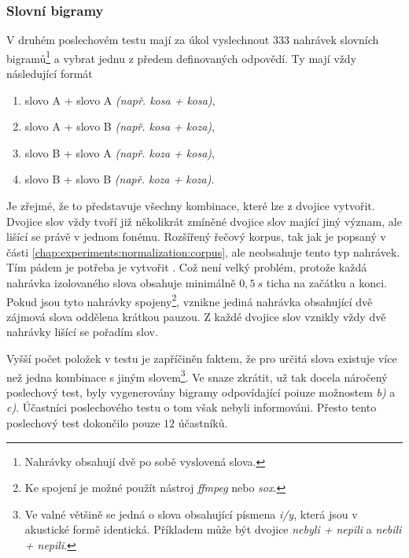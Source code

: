 \subsubsection{Slovní bigramy}

V druhém poslechovém testu mají za úkol vyslechnout $333$ nahrávek slovních bigramů\footnote{Nahrávky obsahují dvě po sobě vyslovená slova.} a vybrat jednu z předem definovaných odpovědí. Ty mají vždy následující formát

\begin{enumerate}[label=\alph*)]
  \item slovo A + slovo A \textit{(např. kosa + kosa)},
  \item slovo A + slovo B \textit{(např. kosa + koza)},
  \item slovo B + slovo A \textit{(např. koza + kosa)},
  \item slovo B + slovo B \textit{(např. koza + koza)}.
\end{enumerate}

\noindent Je zřejmé, že to představuje všechny kombinace, které lze z dvojice vytvořit. Dvojice slov vždy tvoří již několikrát zmíněné dvojice slov mající jiný význam, ale lišící se právě v jednom fonému. Rozšířený řečový korpus, tak jak je popsaný v části \ref{chap:experiments:normalization:corpus}, ale neobsahuje tento typ nahrávek. Tím pádem je potřeba je vytvořit . Což není velký problém, protože každá nahrávka izolovaného slova obsahuje minimálně $0,5\ s$ ticha na začátku a konci. Pokud jsou tyto nahrávky spojeny\footnote{Ke spojení je možné použít nástroj \textit{ffmpeg} nebo \textit{sox}.}, vznikne jediná nahrávka obsahující dvě zájmová slova oddělena krátkou pauzou. Z každé dvojice slov vznikly vždy dvě nahrávky lišící se pořadím slov.

Vyšší počet položek v testu je zapříčiněn faktem, že pro určitá slova existuje více než jedna kombinace s jiným slovem\footnote{Ve valné většině se jedná o slova obsahující písmena \textit{i/y}, která jsou v akustické formě identická. Příkladem může být dvojice \textit{nebyli + nepili} a \textit{nebili + nepili}.}. Ve snaze zkrátit, už tak docela náročený poslechový test, byly vygenerovány bigramy odpovídající poiuze možnostem \textit{b)} a \textit{c)}. Účastníci poslechového testu o tom však nebyli informováni. Přesto tento poslechový test dokončilo pouze $12$ účastníků.

